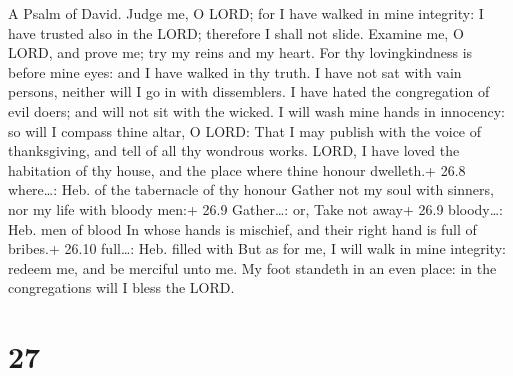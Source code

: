A Psalm of David.  Judge me, O LORD; for I have walked in
mine integrity: I have trusted also in the LORD; therefore I shall not
slide.  Examine me, O LORD, and prove me; try my reins and
my heart.  For thy lovingkindness is before mine eyes: and I
have walked in thy truth.  I have not sat with vain persons,
neither will I go in with dissemblers.  I have hated the
congregation of evil doers; and will not sit with the wicked.
 I will wash mine hands in innocency: so will I compass
thine altar, O LORD:  That I may publish with the voice of
thanksgiving, and tell of all thy wondrous works.  LORD, I
have loved the habitation of thy house, and the place where thine honour
dwelleth.+ 26.8 where\ldots: Heb. of the tabernacle of thy honour
 Gather not my soul with sinners, nor my life with bloody
men:+ 26.9 Gather\ldots: or, Take not away+ 26.9 bloody\ldots: Heb. men
of blood  In whose hands is mischief, and their right hand
is full of bribes.+ 26.10 full\ldots: Heb. filled with  But
as for me, I will walk in mine integrity: redeem me, and be merciful
unto me.  My foot standeth in an even place: in the
congregations will I bless the LORD.

\hypertarget{section-26}{%
\section{27}\label{section-26}}

